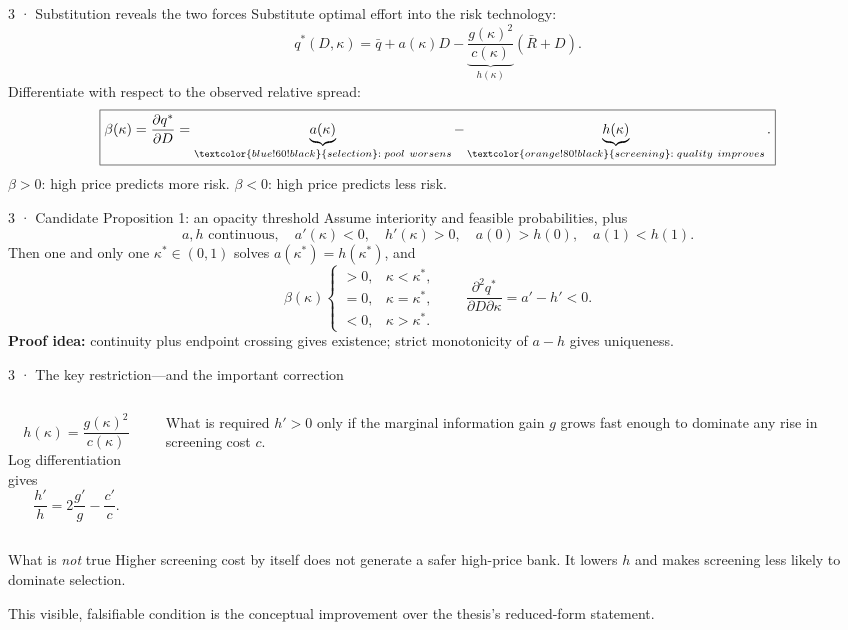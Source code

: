 \documentclass[aspectratio=169,11pt]{beamer}
\newcommand{\selection}{\textcolor{blue!60!black}{selection}}
\newcommand{\screening}{\textcolor{orange!80!black}{screening}}
\begin{document}
\begin{frame}{3 · Substitution reveals the two forces}
  Substitute optimal effort into the risk technology:
  \[
    q^*(D,\kappa)=\bar q+a(\kappa)D
    -\underbrace{\frac{g(\kappa)^2}{c(\kappa)}}_{h(\kappa)}(\bar R+D).
  \]
  Differentiate with respect to the observed relative spread:
  \[
    \boxed{\beta(\kappa)=\frac{\partial q^*}{\partial D}
      =\underbrace{a(\kappa)}_{\selection:\;pool\ worsens}
      -\underbrace{h(\kappa)}_{\screening:\;quality\ improves}.}
  \]
  \vfill
  \centering
  \(\beta>0\): high price predicts more risk. \quad
  \(\beta<0\): high price predicts less risk.
\end{frame}

\begin{frame}{3 · Candidate Proposition 1: an opacity threshold}
  \small
  Assume interiority and feasible probabilities, plus
  \[
    a,h\text{ continuous},\quad a'(\kappa)<0,\quad h'(\kappa)>0,
    \quad a(0)>h(0),\quad a(1)<h(1).
  \]
  Then one and only one \(\kappa^*\in(0,1)\) solves
  \(a(\kappa^*)=h(\kappa^*)\), and
  \[
    \beta(\kappa)
    \begin{cases}
      >0,&\kappa<\kappa^*,\\
      =0,&\kappa=\kappa^*,\\
      <0,&\kappa>\kappa^*.
    \end{cases}
    \qquad
    \frac{\partial^2q^*}{\partial D\partial\kappa}=a'-h'<0.
  \]
  \vfill
  \textbf{Proof idea:} continuity plus endpoint crossing gives existence;
  strict monotonicity of \(a-h\) gives uniqueness.
\end{frame}

\begin{frame}{3 · The key restriction---and the important correction}
  \begin{columns}[c,onlytextwidth]
      \[
        h(\kappa)=\frac{g(\kappa)^2}{c(\kappa)}
      \]
      Log differentiation gives
      \[
        \frac{h'}{h}=2\frac{g'}{g}-\frac{c'}{c}.
      \]
      \begin{alertblock}{What is required}
        \(h'>0\) only if the marginal information gain \(g\) grows fast enough
        to dominate any rise in screening cost \(c\).
      \end{alertblock}
  \end{columns}
  \vspace{0.7em}
  \begin{block}{What is \emph{not} true}
    Higher screening cost by itself does not generate a safer high-price bank.
    It lowers \(h\) and makes screening less likely to dominate selection.
  \end{block}
  \centering
  This visible, falsifiable condition is the conceptual improvement over the
  thesis's reduced-form statement.
\end{frame}
\end{document}
